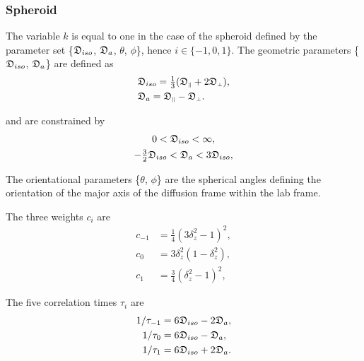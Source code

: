 \subsubsection{Spheroid}
The variable $k$ is equal to one in the case of the spheroid  defined by the parameter set \{$\mathfrak{D}_{iso}$, $\mathfrak{D}_a$, $\theta$, $\phi$\}, hence $i \in \{-1, 0, 1\}$.  The geometric parameters \{$\mathfrak{D}_{iso}$, $\mathfrak{D}_a$\} are defined as
\begin{subequations}
\begin{align}
 & \mathfrak{D}_{iso} = \tfrac{1}{3} (\mathfrak{D}_{\scriptscriptstyle \parallel} + 2\mathfrak{D}_{\scriptscriptstyle \perp}),   \label{eq: Diso spheroid def} \\
 & \mathfrak{D}_a = \mathfrak{D}_{\scriptscriptstyle \parallel} - \mathfrak{D}_{\scriptscriptstyle \perp}.                       \label{eq: Da spheroid def}
\end{align}
\end{subequations}

\noindent and are constrained by
\begin{subequations}
\begin{gather}
 0 < \mathfrak{D}_{iso} < \infty, \\
 -\tfrac{3}{2} \mathfrak{D}_{iso} < \mathfrak{D}_a < 3\mathfrak{D}_{iso},
\end{gather}
\end{subequations}

\noindent The orientational parameters \{$\theta$, $\phi$\} are the spherical angles defining the orientation of the major axis of the diffusion frame within the lab frame.


The three weights $c_i$ are
\begin{subequations}
\begin{align}
 c_{-1} &= \tfrac{1}{4}(3\delta_z^2 - 1)^2, \label{eq: spheroid c-1} \\
 c_{0}  &= 3\delta_z^2(1 - \delta_z^2),     \label{eq: spheroid c0} \\
 c_{1}  &= \tfrac{3}{4}(\delta_z^2 - 1)^2,  \label{eq: spheroid c1}
\end{align}
\end{subequations}

The five correlation times $\tau_i$ are
\begin{subequations}
\begin{align}
 1/\tau_{-1} &= 6\mathfrak{D}_{iso} - 2\mathfrak{D}_a,    \label{eq: spheroid tau-1} \\
 1/\tau_{0}  &= 6\mathfrak{D}_{iso} - \mathfrak{D}_a,     \label{eq: spheroid tau0} \\
 1/\tau_{1}  &= 6\mathfrak{D}_{iso} + 2\mathfrak{D}_a.    \label{eq: spheroid tau1}
\end{align}
\end{subequations}


